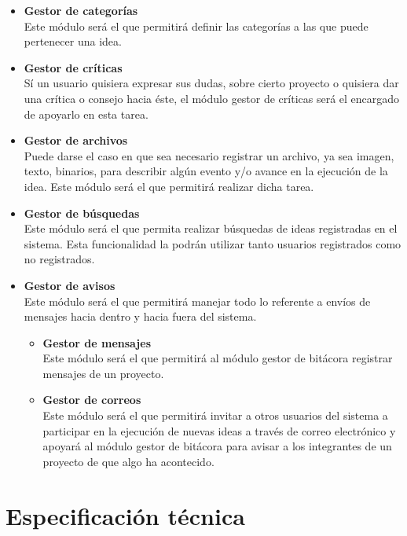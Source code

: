 \documentclass[11pt,letterpaper,titlepage]{article}
\begin{document}
\begin{itemize}
 \item \textbf{Gestor de categor\'ias}\\
Este m\'odulo ser\'a el que permitir\'a definir las categor\'ias a las que puede pertenecer una idea.


 \item \textbf{Gestor de cr\'iticas}\\
S\'i un usuario quisiera expresar sus dudas, sobre cierto proyecto o quisiera dar una cr\'itica o consejo hacia \'este, el m\'odulo gestor de cr\'iticas ser\'a el encargado de apoyarlo en esta tarea.

 \item \textbf{Gestor de archivos}\\
Puede darse el caso en que sea necesario registrar un archivo, ya sea imagen, texto, binarios, para describir alg\'un evento y/o avance en la ejecuci\'on de la idea. Este m\'odulo ser\'a el que permitir\'a realizar dicha tarea.

 \item \textbf{Gestor de b\'usquedas}\\
Este m\'odulo ser\'a el que permita realizar b\'usquedas de ideas registradas en el sistema. Esta funcionalidad la podr\'an utilizar tanto usuarios registrados como no registrados.

 \item \textbf{Gestor de avisos}\\
Este m\'odulo ser\'a el que permitir\'a manejar todo lo referente a env\'ios de mensajes hacia dentro y hacia fuera del sistema. 
 
\begin{itemize}
 \item  \textbf{Gestor de mensajes}\\
Este m\'odulo ser\'a el que permitir\'a al m\'odulo gestor de bit\'acora registrar mensajes de un proyecto.

 \item \textbf{Gestor de correos}\\
Este m\'odulo ser\'a el que permitir\'a invitar a otros usuarios del sistema a participar en la ejecuci\'on de nuevas ideas a trav\'es de correo electr\'onico y apoyar\'a al m\'odulo gestor de bit\'acora para avisar a los integrantes de un proyecto de que algo ha acontecido.
\end{itemize}
\end{itemize}


\section{Especificaci\'on t\'ecnica}
\end{document}
